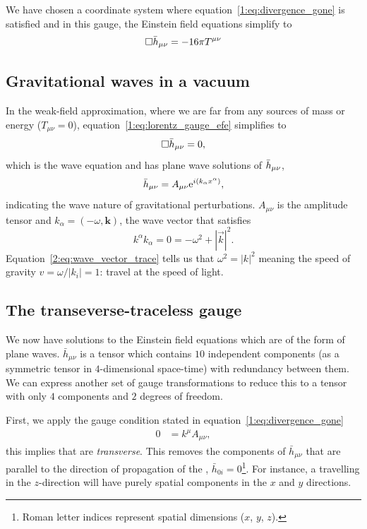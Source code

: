 We have chosen a coordinate system where equation~\ref{1:eq:divergence_gone} is satisfied and in this gauge, the Einstein field equations simplify to
%
\begin{equation}
    \Box \Bar{h}_{\mu\nu} = -16 \pi T^{\mu\nu}
    \label{1:eq:lorentz_gauge_efe}
\end{equation}
%

\subsection{\label{1:sec:gw_in_vacuum}Gravitational waves in a vacuum}

In the weak-field approximation, where we are far from any sources of mass or energy ($T_{\mu\nu} = 0$), equation~\ref{1:eq:lorentz_gauge_efe} simplifies to
%
\begin{equation}
    \Box \Bar{h}_{\mu\nu} = 0,
\end{equation}
%
which is the wave equation and has plane wave solutions of $\Bar{h}_{\mu\nu}$,
%
\begin{equation}
    \Bar{h}_{\mu\nu} = A_{\mu\nu} {\rm e}^{i(k_\alpha x^\alpha)},
\end{equation}
%
indicating the wave nature of gravitational perturbations. $A_{\mu\nu}$ is the amplitude tensor and $k_\alpha = (-\omega, \textbf{k})$, the wave vector that satisfies
%
\begin{equation}
    k^{\alpha} k_{\alpha} = 0 = -\omega^{2} + |\vec{k}|^{2}.
    \label{2:eq:wave_vector_trace}
\end{equation}
%
Equation~\ref{2:eq:wave_vector_trace} tells us that $\omega^{2} = |k|^{2}$ meaning the speed of gravity $v = \omega / |k_{i}| = 1$: \gws travel at the speed of light. 

\subsection{\label{}The transeverse-traceless gauge}

We now have solutions to the Einstein field equations which are of the form of plane waves. $\bar{h}_{\mu\nu}$ is a tensor which contains $10$ independent components (as a symmetric tensor in $4$-dimensional space-time) with redundancy between them. We can express another set of gauge transformations to reduce this to a tensor with only $4$ components and $2$ degrees of freedom.

First, we apply the gauge condition stated in equation~\ref{1:eq:divergence_gone}
%
\begin{align}
    0 &= k^{\mu} A_{\mu\nu},
\end{align}
%
this implies that \gws are \textit{transverse}. This removes the components of $\bar{h}_{\mu\nu}$ that are parallel to the direction of propagation of the \gw, $\bar{h}_{0i} = 0$\footnote{Roman letter indices represent spatial dimensions ($x$, $y$, $z$).}. For instance, a \gw travelling in the $z$-direction will have purely spatial components in the $x$ and $y$ directions.

